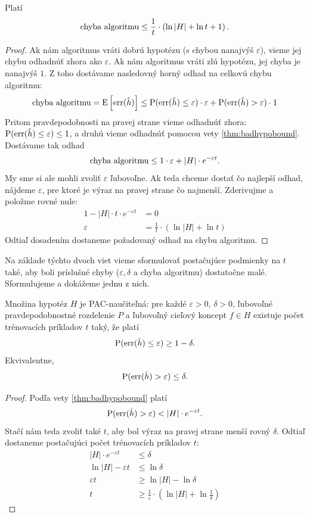 \begin{theorem}
  Platí
  $$ \text{\normalfont chyba algoritmu} \leq \frac{1}{t} \cdot \left( \ln{|H|} + \ln{t} + 1 \right). $$
\end{theorem}
\begin{proof}
  Ak nám algoritmus vráti dobrú hypotézu (s chybou nanajvýš $\varepsilon$),
  vieme jej chybu odhadnúť zhora ako $\varepsilon$. Ak nám algoritmus vráti
  zlú hypotézu, jej chyba je nanajvýš $1$. Z toho dostávame nasledovný
  horný odhad na celkovú chybu algoritmu:
  $$ \text{\normalfont chyba algoritmu} = \operatorname*{\mathrm{E}} \left[ \mathrm{err}(\hat{h}) \right] \leq \operatorname*{\mathrm{P}}(\mathrm{err}(\hat{h}) \leq \varepsilon) \cdot \varepsilon + \operatorname*{\mathrm{P}}(\mathrm{err}(\hat{h}) > \varepsilon) \cdot 1$$
  Pritom pravdepodobnosti na pravej strane vieme odhadnúť zhora:
  $\operatorname*{\mathrm{P}}(\mathrm{err}(\hat{h}) \leq \varepsilon) \leq 1$, a druhú vieme
  odhadnúť pomocou vety \ref{thm:badhypobound}. Dostávame tak odhad
  $$ \text{\normalfont chyba algoritmu} \leq 1 \cdot \varepsilon + |H| \cdot e^{-\varepsilon t}. $$
  My sme si ale mohli zvoliť $\varepsilon$ ľubovoľne. Ak teda chceme
  dostať čo najlepší odhad, nájdeme $\varepsilon$, pre ktoré je výraz
  na pravej strane čo najmenší. Zderivujme a položme rovné nule:
  \begin{align}
    1 - |H| \cdot t \cdot e^{-\varepsilon t} &= 0 \\
    \varepsilon &= \frac{1}{t} \cdot \left( \ln{|H|} + \ln{t} \right)
  \end{align}
  Odtiaľ dosadením dostaneme požadovaný odhad na chybu algoritmu.
\end{proof}

Na základe týchto dvoch viet vieme sformulovať postačujúce podmienky
na $t$ také, aby boli príslušné chyby ($\varepsilon, \delta$ a chyba
algoritmu) dostatočne malé. Sformulujeme a dokážeme jednu z nich.

\begin{corollary}
  Množina hypotéz $H$ je PAC-naučiteľná: pre každé $\varepsilon > 0$,
  $\delta > 0$, ľubovoľné pravdepodobnostné rozdelenie $P$ a ľubovoľný
  cieľový koncept $f \in H$ existuje počet trénovacích príkladov $t$
  taký, že platí
  $$\operatorname*{\mathrm{P}}(\mathrm{err}(\hat{h}) \leq \varepsilon) \geq 1 - \delta.$$
  Ekvivalentne,
  $$\operatorname*{\mathrm{P}}(\mathrm{err}(\hat{h}) > \varepsilon) \leq \delta.$$
\end{corollary}
\begin{proof}
  Podľa vety \ref{thm:badhypobound} platí
  $$\operatorname*{\mathrm{P}}(\mathrm{err}(\hat{h}) > \varepsilon) < |H| \cdot e^{-\varepsilon t}.$$
  Stačí nám teda zvoliť také $t$, aby bol výraz na pravej strane menší
  rovný $\delta$. Odtiaľ dostaneme postačujúci počet trénovacích
  príkladov $t$:
  \begin{align}
    |H| \cdot e^{-\varepsilon t} &\leq \delta \\
    \ln{|H|} - \varepsilon t &\leq \ln{\delta} \\
    \varepsilon t &\geq \ln{|H|} - \ln{\delta} \\
    t &\geq \frac{1}{\varepsilon} \cdot \left( \ln{|H|} + \ln{\frac{1}{\delta}} \right)
  \end{align}
\end{proof}



